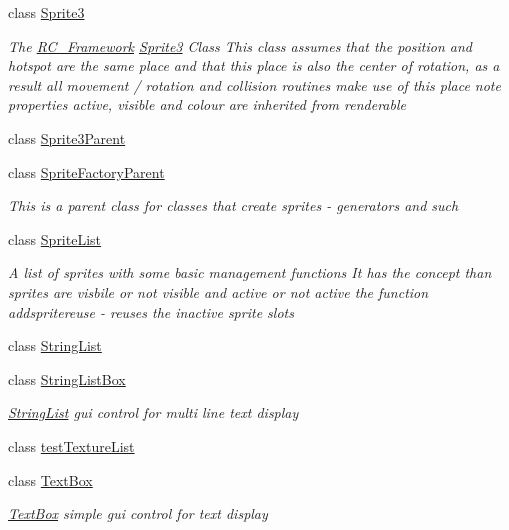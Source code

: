 \begin{DoxyCompactItemize}
class \mbox{\hyperlink{class_r_c___framework_1_1_sprite3}{Sprite3}}
\begin{DoxyCompactList}\small\item\em The \mbox{\hyperlink{namespace_r_c___framework}{R\+C\+\_\+\+Framework}} \mbox{\hyperlink{class_r_c___framework_1_1_sprite3}{Sprite3}} Class This class assumes that the position and hotspot are the same place and that this place is also the center of rotation, as a result all movement / rotation and collision routines make use of this place note properties active, visible and colour are inherited from renderable \end{DoxyCompactList}\item 
class \mbox{\hyperlink{class_r_c___framework_1_1_sprite3_parent}{Sprite3\+Parent}}
\item 
class \mbox{\hyperlink{class_r_c___framework_1_1_sprite_factory_parent}{Sprite\+Factory\+Parent}}
\begin{DoxyCompactList}\small\item\em This is a parent class for classes that create sprites -\/ generators and such \end{DoxyCompactList}\item 
class \mbox{\hyperlink{class_r_c___framework_1_1_sprite_list}{Sprite\+List}}
\begin{DoxyCompactList}\small\item\em A list of sprites with some basic management functions It has the concept than sprites are visbile or not visible and active or not active the function addspritereuse -\/ reuses the inactive sprite slots \end{DoxyCompactList}\item 
class \mbox{\hyperlink{class_r_c___framework_1_1_string_list}{String\+List}}
\item 
class \mbox{\hyperlink{class_r_c___framework_1_1_string_list_box}{String\+List\+Box}}
\begin{DoxyCompactList}\small\item\em \mbox{\hyperlink{class_r_c___framework_1_1_string_list}{String\+List}} gui control for multi line text display \end{DoxyCompactList}\item 
class \mbox{\hyperlink{class_r_c___framework_1_1test_texture_list}{test\+Texture\+List}}
\item 
class \mbox{\hyperlink{class_r_c___framework_1_1_text_box}{Text\+Box}}
\begin{DoxyCompactList}\small\item\em \mbox{\hyperlink{class_r_c___framework_1_1_text_box}{Text\+Box}} simple gui control for text display \end{DoxyCompactList}\item 

\end{DoxyCompactItemize}

